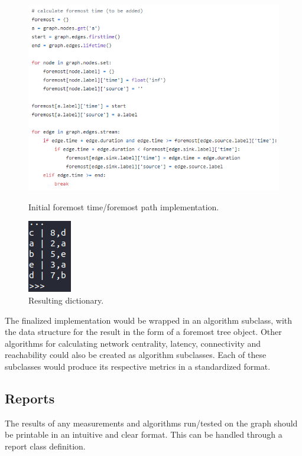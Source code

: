 \begin{design}
\clearpage
\begin{figure}[t]
  \centering
  \begin{minipage}[b]{0.4\textwidth}
    \centering
    \includegraphics[scale=0.8]{images/foremost_code.PNG}
    \caption{Initial foremost time/foremost path implementation.}
  \end{minipage}
  \hfill
  \begin{minipage}[b]{0.4\textwidth}
    \centering
    \includegraphics[scale=0.7]{images/foremost_result.PNG}
    \caption{Resulting dictionary.}
  \end{minipage}
\end{figure}
The finalized implementation would be wrapped in an algorithm subclass, with the data structure for the result in the form of a foremost tree object. Other algorithms for calculating network centrality, latency, connectivity and reachability could also be created as algorithm subclasses. Each of these subclasses would produce its respective metrics in a standardized format.
\subsection{Reports}
The results of any measurements and algorithms run/tested on the graph should be printable in an intuitive and clear format. This can be handled through a report class definition.

\end{design}
